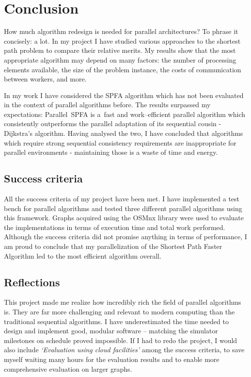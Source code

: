 \documentclass[12pt,a4paper,twoside,openright]{report}
\begin{document}
\chapter{Conclusion}
How much algorithm redesign is needed for parallel architectures? To phrase it concisely: a lot. In my project I have studied various approaches to the shortest path problem to compare their relative merits. My results show that the most appropriate algorithm may depend on many factors: the number of processing elements available, the size of the problem instance, the costs of communication between workers, and more. 

In my work I have considered the SPFA algorithm which has not been evaluated in the context of parallel algorithms before. The results surpassed my expectations: Parallel~SPFA is a~fast and work--efficient parallel algorithm which consistently outperforms the parallel adaptation of its sequential cousin - Dijkstra's algorithm. Having analysed the two, I have concluded that algorithms which require strong sequential consistency requirements are inappropriate for parallel environments - maintaining those is a waste of time and energy.

\section{Success criteria}
All the success criteria of my project have been met. I have implemented a test bench for parallel algorithms and tested three different parallel algorithms using this framework. Graphs acquired using the OSMnx library were used to evaluate the implementations in terms of execution time and total work performed. Although the success criteria did not promise anything in terms of performance, I am proud to conclude that my parallelization of the Shortest Path Faster Algorithm led to the most efficient algorithm overall.

\section{Reflections}
This project made me realize how incredibly rich the field of parallel algorithms is. They are far more challenging and relevant to modern computing than the traditional sequential algorithms. I have underestimated the time needed to design and implement good, modular software -- matching the simulator milestones on schedule proved impossible. If I had to redo the project, I would also include \textit{`Evaluation using cloud facilities'} among the success criteria, to save myself waiting many hours for the evaluation results and to enable more comprehensive evaluation on larger graphs.
\end{document}
